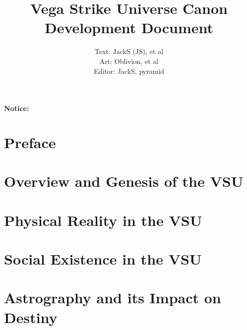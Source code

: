 %
%



\title{Vega Strike Universe Canon \\ 
Development Document}

\author{Text: JackS (JS), et al \\
Art: Oblivion, et al \\
Editor: JackS, pyramid}

\renewcommand{\thepage}{\roman{page}}
\maketitle
\renewcommand{\thepage}{\arabic{page}}
\thispagestyle{empty}
\centerline{\bf {\Huge Notice:}}
{\it

}

\setcounter{tocdepth}{2}
\clearpage
{}
{}
\tableofcontents
\listoftables
{}
\listoffigures
{}
\chapter*{Preface}


\chapter{Overview and Genesis of the VSU}


\chapter{Physical Reality in the VSU}


\chapter{Social Existence in the VSU}


\chapter{Astrography and its Impact on Destiny}


